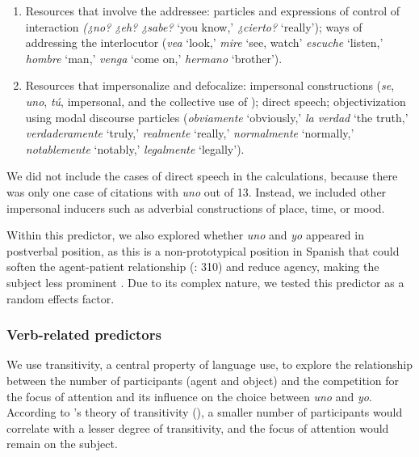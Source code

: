 \documentclass[output=paper]{langscibook}
\begin{document}
\begin{enumerate}
 
     \item Resources that involve the addressee: particles and expressions of control of interaction \textit{(¿no? ¿eh? ¿sabe?} ‘you know,’ \textit{¿cierto?} ‘really’); ways of addressing the interlocutor (\textit{vea} ‘look,’ \textit{mire} ‘see, watch’ \textit{escuche} ‘listen,’ \textit{hombre} ‘man,’ \textit{venga} ‘come on,’ \textit{hermano} ‘brother’).

 
     \item Resources that impersonalize and defocalize: impersonal constructions (\textit{se}, \textit{uno}, \textit{tú},  impersonal, and the collective use of ); direct speech; objectivization using modal discourse particles (\textit{obviamente} ‘obviously,’ \textit{la verdad} ‘the truth,’ \textit{verdaderamente} ‘truly,’ \textit{realmente} ‘really,’ \textit{normalmente} ‘normally,’ \textit{notablemente} ‘notably,’ \textit{legalmente} ‘legally’). 

 \end{enumerate}

We did not include the cases of direct speech in the calculations, because there was only one case of citations with \textit{uno} out of 13. Instead, we included other impersonal inducers such as adverbial constructions of place, time, or mood. 



Within this predictor, we also explored whether \textit{uno} and \textit{yo} appeared in postverbal position, as this is a non-prototypical position in Spanish that could soften the agent-patient relationship (\citealt{AijónOlivaSerrano2013}: 310) and reduce agen\-cy, making the subject less prominent \citep{Serrano2012}. Due to its complex nature, we tested this predictor as a random effects factor. 



\subsubsection{Verb-related predictors}\label{sec:orozco:3.3.2}
\label{sec:orozco:3.3.2.1}



We use transitivity, a central property of language use, to explore the relationship between the number of participants (agent and object) and the competition for the focus of attention and its influence on the choice between \textit{uno} and \textit{yo}. According to \citeauthor{HopperThompson1980}’s theory of transitivity (\citeyear{HopperThompson1980}), a smaller number of participants would correlate with a lesser degree of transitivity, and the focus of attention would remain on the subject. 
\end{document}
